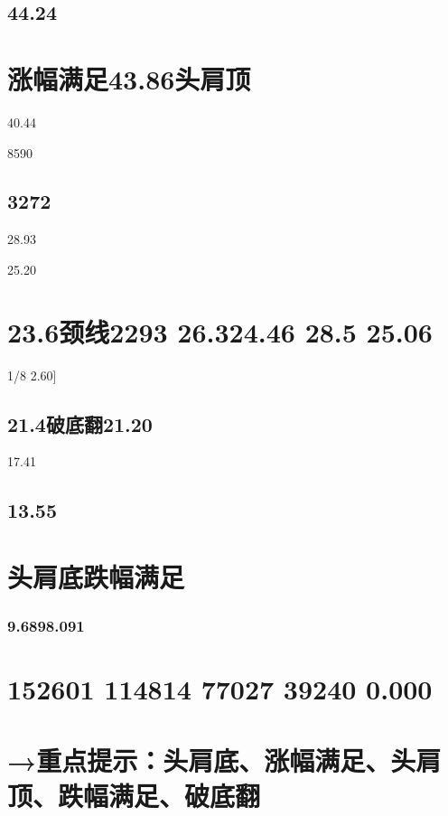 \documentclass{article}
\begin{document}
\subsection{44.24}

\section{涨幅满足43.86头肩顶}

40.44

8590

\subsection{3272}

28.93

25.20

\section{23.6颈线2293 26.324.46 28.5 25.06}

1/8 2.60]

\subsection{21.4破底翻21.20}

17.41

\subsection{13.55}

\section{头肩底跌幅满足}

\subsubsection{9.6898.091}

\section{152601 114814 77027 39240 0.000}

\section{→重点提示：头肩底、涨幅满足、头肩顶、跌幅满足、破底翻}
\end{document}
